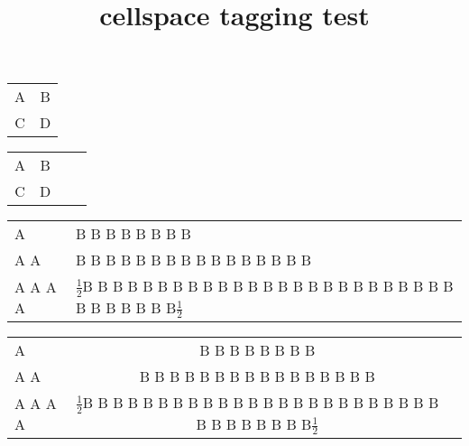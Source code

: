 \documentclass{article}
\title{cellspace tagging test}
\begin{document}
\begin{tabular}{cc}
A & B \\
C & D
\end{tabular}

\bigskip

\begin{tabular}{Sc Sc}
A & B \\
C & D
\end{tabular}

\bigskip

\begin{tabularx}{\linewidth}{l X}
  \hline
  A       & B B B B B B B B \\
  A A     & B B B B B B B B
            B B B B B B B B \\
  A A A A & $\frac{1}{2}$B B B B B B B B
            B B B B B B B B
            B B B B B B B B
            B B B B B B B B$\frac{1}{2}$ \\
  \hline
\end{tabularx}

\bigskip

\begin{tabularx}{\linewidth}{l SX}
  \hline
  A       & B B B B B B B B \\
  A A     & B B B B B B B B
            B B B B B B B B \\
  A A A A & $\frac{1}{2}$B B B B B B B B
            B B B B B B B B
            B B B B B B B B
            B B B B B B B B$\frac{1}{2}$ \\
  \hline
\end{tabularx}
\end{document}
